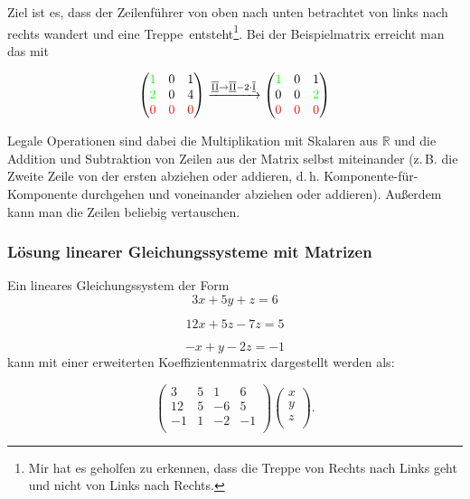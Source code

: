 \documentclass{scrartcl}
\newcommand{\ro}[1]{\ensuremath{\overline{\textrm{\underline{#1}}}}}
\begin{document}
Ziel ist es, dass der Zeilenführer von oben nach unten betrachtet von links nach rechts wandert und
eine \frq Treppe\flq\ entsteht\footnote{Mir hat es geholfen zu erkennen, dass die Treppe von Rechts nach
Links geht und nicht von Links nach Rechts.}.
Bei der Beispielmatrix erreicht man das mit 

\begin{equation}
	\begin{pmatrix*}
		\textcolor{green}{1} & 0 & 1\\
		\textcolor{green}{2} & 0 & 4\\
		\textcolor{red}{0} & \textcolor{red}{0} & \textcolor{red}{0}\\
	\end{pmatrix*} \xrightarrow{\ro{II} \rightarrow \ro{II} - 2\cdot \ro{I}} \begin{pmatrix*}
		\textcolor{green}{1} & 0 & 1\\
		0 & 0 & \textcolor{green}{2}\\
		\textcolor{red}{0} & \textcolor{red}{0} & \textcolor{red}{0}\\
	\end{pmatrix*}
\end{equation}

Legale Operationen sind dabei die Multiplikation mit Skalaren aus $\mathbb{R}$ und die Addition und Subtraktion von
Zeilen aus der Matrix selbst miteinander (z.\,B. die Zweite Zeile von der ersten abziehen oder addieren, d.\,h. Komponente-für-Komponente
durchgehen und voneinander abziehen oder addieren). Außerdem kann man die Zeilen beliebig vertauschen.

\subsubsection{Lösung linearer Gleichungssysteme mit Matrizen}

Ein lineares Gleichungssystem der Form 
\begin{equation}
	3x + 5y + z = 6
\end{equation}

\begin{equation}
	12x + 5z - 7z = 5
\end{equation}

\begin{equation}
	-x + y - 2z = -1
\end{equation}
kann mit einer erweiterten Koeffizientenmatrix dargestellt werden als:

\begin{equation}
	\left(
	\begin{array}{ccc|c}
		3 & 5 & 1 & 6\\
		12 & 5 & -6 & 5\\
		-1 & 1 & -2 & -1\\
	\end{array}
	\right)\begin{pmatrix*}
		x\\
		y\\
		z\\
	\end{pmatrix*}.
\end{equation}
\end{document}

